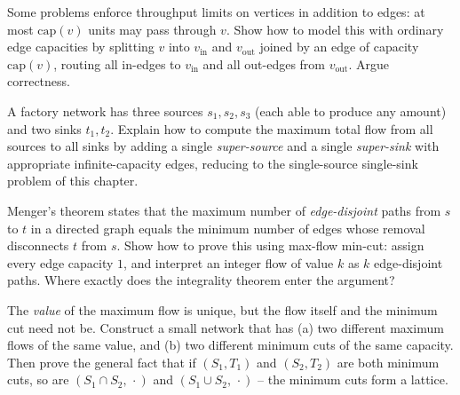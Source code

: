 \begin{exercise}
\label{ch26:ex-vertex-cap}
Some problems enforce throughput limits on vertices in addition to edges:
at most $\mathrm{cap}(v)$ units may pass through $v$. Show how to model this with
ordinary edge capacities by splitting $v$ into $v_{\text{in}}$ and
$v_{\text{out}}$ joined by an edge of capacity $\mathrm{cap}(v)$, routing all
in-edges to $v_{\text{in}}$ and all out-edges from $v_{\text{out}}$. Argue
correctness.
\end{exercise}

\begin{exercise}
\label{ch26:ex-multi}
A factory network has three sources $s_1,s_2,s_3$ (each able to produce any
amount) and two sinks $t_1,t_2$. Explain how to compute the maximum total flow
from all sources to all sinks by adding a single \emph{super-source} and a
single \emph{super-sink} with appropriate infinite-capacity edges, reducing to
the single-source single-sink problem of this chapter.
\end{exercise}

\begin{exercise}
\label{ch26:ex-disjoint}
Menger's theorem states that the maximum number of \emph{edge-disjoint} paths
from $s$ to $t$ in a directed graph equals the minimum number of edges whose
removal disconnects $t$ from $s$. Show how to prove this using max-flow
min-cut: assign every edge capacity $1$, and interpret an integer flow of value
$k$ as $k$ edge-disjoint paths. Where exactly does the integrality theorem enter
the argument?
\end{exercise}

\begin{exercise}
\label{ch26:ex-unique}
The \emph{value} of the maximum flow is unique, but the flow itself and the
minimum cut need not be. Construct a small network that has (a) two different
maximum flows of the same value, and (b) two different minimum cuts of the same
capacity. Then prove the general fact that if $(S_1,T_1)$ and $(S_2,T_2)$ are
both minimum cuts, so are $(S_1\cap S_2,\,\cdot)$ and $(S_1\cup S_2,\,\cdot)$ --
the minimum cuts form a lattice.
\end{exercise}
